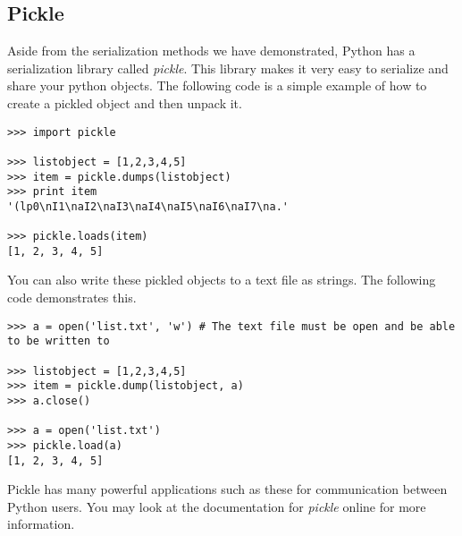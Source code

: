 \subsection*{Pickle} 
Aside from the serialization methods we have demonstrated, Python has a serialization library called \emph{pickle}.
This library makes it very easy to serialize and share your python objects.
The following code is a simple example of how to create a pickled object and then unpack it.
\begin{lstlisting}
>>> import pickle

>>> listobject = [1,2,3,4,5]
>>> item = pickle.dumps(listobject)
>>> print item
'(lp0\nI1\naI2\naI3\naI4\naI5\naI6\naI7\na.'

>>> pickle.loads(item)
[1, 2, 3, 4, 5]
\end{lstlisting}

You can also write these pickled objects to a text file as strings. The following code demonstrates this.
\begin{lstlisting}
>>> a = open('list.txt', 'w') # The text file must be open and be able to be written to

>>> listobject = [1,2,3,4,5]
>>> item = pickle.dump(listobject, a)
>>> a.close()

>>> a = open('list.txt')
>>> pickle.load(a)
[1, 2, 3, 4, 5]
\end{lstlisting}

Pickle has many powerful applications such as these for communication between Python users.
You may look at the documentation for \emph{pickle} online for more information.
